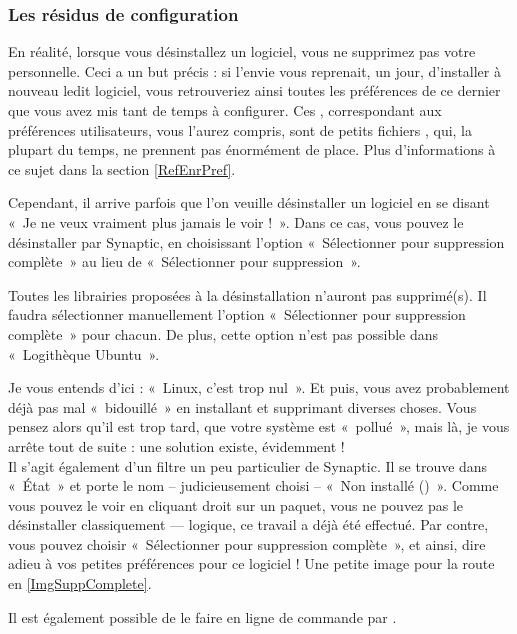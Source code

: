 \subsubsection{Les résidus de configuration}
En réalité, lorsque vous désinstallez un logiciel, vous ne supprimez pas votre  personnelle. Ceci a un but précis : si l'envie vous reprenait, un jour, d'installer à nouveau ledit logiciel, vous retrouveriez ainsi toutes les préférences de ce dernier que vous avez mis tant de temps à configurer. Ces , correspondant aux préférences utilisateurs, vous l'aurez compris, sont de petits fichiers , qui, la plupart du temps, ne prennent pas énormément de place. Plus d'informations à ce sujet dans la section \ref{RefEnrPref}.\par
Cependant, il arrive parfois que l'on veuille désinstaller un logiciel en se disant «~Je ne veux vraiment plus jamais le voir !~». Dans ce cas, vous pouvez le désinstaller par Synaptic, en choisissant l'option «~Sélectionner pour suppression complète~» au lieu de «~Sélectionner pour suppression~».
\begin{attention}
Toutes les librairies proposées à la désinstallation n'auront pas  supprimé(s). Il faudra sélectionner manuellement l'option «~Sélectionner pour suppression complète~» pour chacun. De plus, cette option n'est pas possible dans «~Logithèque Ubuntu~».
\end{attention}\par
Je vous entends d'ici : «~Linux, c'est trop nul~». Et puis, vous avez probablement déjà pas mal «~bidouillé~» en installant et supprimant diverses choses. Vous pensez alors qu'il est trop tard, que votre système est «~pollué~», mais là, je vous arrête tout de suite : une solution existe, évidemment !\\
Il s'agit également d'un filtre un peu particulier de Synaptic. Il se trouve dans «~État~» et porte le nom -- judicieusement choisi -- «~Non installé ()~». Comme vous pouvez le voir en cliquant droit sur un paquet, vous ne pouvez pas le désinstaller classiquement --- logique, ce travail a déjà été effectué. Par contre, vous pouvez choisir «~Sélectionner pour suppression complète~», et ainsi, dire adieu à vos petites préférences pour ce logiciel ! Une petite image pour la route en \ref{ImgSuppComplete}.
\begin{nota}
Il est également possible de le faire en ligne de commande par  .
\end{nota}
